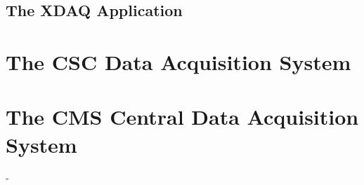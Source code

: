     \subsection{The XDAQ Application}

  \section{The CSC Data Acquisition System}

  \section{The CMS Central Data Acquisition System}






























-
